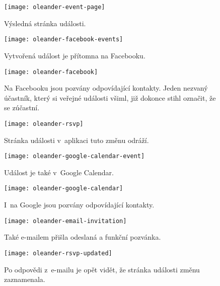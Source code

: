 \documentclass[12pt,oneside,final]{fithesis2}
\begin{document}
\begin{figure}[h]
    \centering
    \texttt{[image: oleander-event-page]}
    \caption{Výsledná stránka události.}
\end{figure}

\begin{figure}[h]
    \centering
    \texttt{[image: oleander-facebook-events]}
    \caption{Vytvořená událost je přítomna na Facebooku.}
\end{figure}

\begin{figure}[h]
    \centering
    \texttt{[image: oleander-facebook]}
    \caption{Na Facebooku jsou pozvány odpovídající kontakty. Jeden nezvaný účastník, který si veřejné události všiml, již dokonce stihl označit, že se  zúčastní.}
\end{figure}

\begin{figure}[h]
    \centering
    \texttt{[image: oleander-rsvp]}
    \caption{Stránka události v~aplikaci tuto změnu odráží.}
\end{figure}

\begin{figure}[h]
    \centering
    \texttt{[image: oleander-google-calendar-event]}
    \caption{Událost je také v~Google Calendar.}
\end{figure}

\begin{figure}[h]
    \centering
    \texttt{[image: oleander-google-calendar]}
    \caption{I~na Google jsou pozvány odpovídající kontakty.}
\end{figure}

\begin{figure}[h]
    \centering
    \texttt{[image: oleander-email-invitation]}
    \caption{Také e-mailem přišla odeslaná a funkční pozvánka.}
\end{figure}

\begin{figure}[h]
    \centering
    \texttt{[image: oleander-rsvp-updated]}
    \caption{Po odpovědi z~e-mailu je opět vidět, že stránka události změnu zaznamenala.}
\end{figure}
\end{document}
